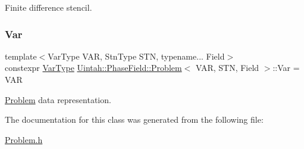 Finite difference stencil. 

\mbox{\label{classUintah_1_1PhaseField_1_1Problem_a74de1351a682f8523456962f0fc49a18}} 
\subsubsection{\texorpdfstring{Var}{Var}}
{\footnotesize\ttfamily template$<$Var\+Type V\+AR, Stn\+Type S\+TN, typename... Field$>$ \\
constexpr \hyperlink{namespaceUintah_1_1PhaseField_a33d355affda78a83f45755ba8388cedd}{Var\+Type} \hyperlink{classUintah_1_1PhaseField_1_1Problem}{Uintah\+::\+Phase\+Field\+::\+Problem}$<$ V\+AR, S\+TN, Field $>$\+::Var = V\+AR\hspace{0.3cm}{\ttfamily [static]}}



\hyperlink{classUintah_1_1PhaseField_1_1Problem}{Problem} data representation. 



The documentation for this class was generated from the following file\+:\begin{DoxyCompactItemize}
\item 
\hyperlink{Problem_8h}{Problem.\+h}\end{DoxyCompactItemize}
